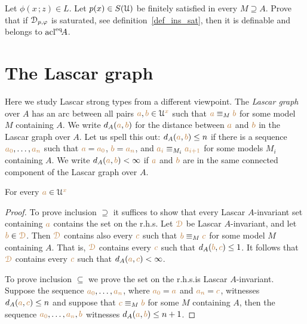 
\begin{exercise}
  Let $\phi(x\,;z)\in L$.
  Let $p(x)\in S(\EuScript U)$ be finitely satisfied in every $M\supseteq A$.
  Prove that if $\EuScript D_{p,\varphi}$ is saturated, see definition~\ref{def_ins_sat}, then it is definable and belongs to ${\rm acl}^{{\rm eq}}\!A$.
\end{exercise}
\section{The Lascar graph}\label{lascar_graph}

Here we study Lascar strong types from a different viewpoint.
The \emph{Lascar graph\/} over $A$ has an arc between all pairs ${\color{brown} a},{\color{brown} b}\in \EuScript U^{\color{brown} x}$ such that  ${\color{brown} a}\equiv_M{\color{brown} b}$ for some model $M$ containing $A$.
We write \emph{$d_A({\color{brown} a},{\color{brown} b})$\/} for the distance between ${\color{brown} a}$ and ${\color{brown} b}$ in the Lascar graph over $A$.
Let us spell this out: $d_A({\color{brown} a},{\color{brown} b})\le n$ if there is a sequence ${\color{brown} a_0},\dots,{\color{brown} a_n}$ such that ${\color{brown} a}={\color{brown} a_0}$, ${\color{brown} b}={\color{brown} a_n}$, and ${\color{brown} a_i}\equiv_{M_i}{\color{brown} a_{i+1}}$ for some models $M_i$ containing $A$.
We write \emph{$d_A({\color{brown} a},{\color{brown} b})<\infty$\/} if ${\color{brown} a}$ and ${\color{brown} b}$ are in the same connected component of the Lascar graph over $A$.

\begin{proposition}\label{tipoforteLascarediametro}
  For every ${\color{brown} a}\in\EuScript U^{\color{brown} x}$

\end{proposition}

\begin{proof}
To prove inclusion $\supseteq$ it suffices to show that every Lascar $A$-invariant set containing ${\color{brown} a}$ contains the set on the r.h.s.
Let ${\color{brown}\EuScript D}$ be Lascar $A$-invariant, and let ${\color{brown} b}\in{\color{brown}\EuScript D}$.
Then ${\color{brown}\EuScript D}$ contains also every ${\color{brown} c}$ such that ${\color{brown} b}\equiv_M{\color{brown} c}$ for some model $M$ containing $A$.
That is, ${\color{brown}\EuScript D}$ contains every ${\color{brown} c}$ such that $d_A({\color{brown} b},{\color{brown} c})\le 1$.
It follows that ${\color{brown}\EuScript D}$ contains every ${\color{brown} c}$ such that $d_A({\color{brown} a},{\color{brown} c})<\infty$. 

To prove inclusion $\subseteq$ we prove the set on the r.h.s.\@ is Lascar $A$-invariant.
Suppose the sequence ${\color{brown} a_0},\dots,{\color{brown} a_n}$, where ${\color{brown} a_0}={\color{brown} a}$ and ${\color{brown} a_n}={\color{brown} c}$, witnesses $d_A({\color{brown} a},{\color{brown} c})\le n$ and suppose that ${\color{brown} c}\equiv_M{\color{brown} b}$ for some $M$ containing $A$, then the sequence ${\color{brown} a_0},\dots,{\color{brown} a_n},{\color{brown} b}$ witnesses $d_A({\color{brown} a},{\color{brown} b})\le n+1$.
\end{proof}

